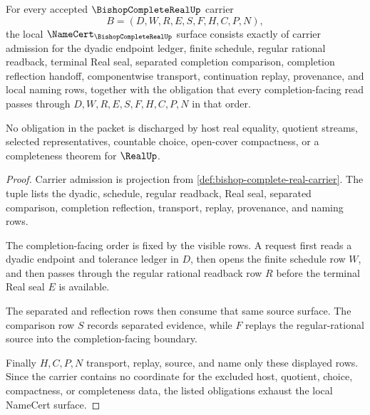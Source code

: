 \begin{theorem}
\label{thm:bishop-complete-real-namecert-obligations}
For every accepted $\BishopCompleteRealUp$ carrier
$$
B=(D,W,R,E,S,F,H,C,P,N),
$$
the local $\NameCert_{\BishopCompleteRealUp}$ surface consists exactly of carrier admission for the dyadic endpoint ledger, finite schedule, regular rational readback, terminal Real seal, separated completion comparison, completion reflection handoff, componentwise transport, continuation replay, provenance, and local naming rows, together with the obligation that every completion-facing read passes through $D,W,R,E,S,F,H,C,P,N$ in that order.

No obligation in the packet is discharged by host real equality, quotient streams, selected representatives, countable choice, open-cover compactness, or a completeness theorem for $\RealUp$.
\end{theorem}
\begin{proof}
Carrier admission is projection from \autoref{def:bishop-complete-real-carrier}. The tuple lists the dyadic, schedule, regular readback, Real seal, separated comparison, completion reflection, transport, replay, provenance, and naming rows.

The completion-facing order is fixed by the visible rows. A request first reads a dyadic endpoint and tolerance ledger in $D$, then opens the finite schedule row $W$, and then passes through the regular rational readback row $R$ before the terminal Real seal $E$ is available.

The separated and reflection rows then consume that same source surface. The comparison row $S$ records separated evidence, while $F$ replays the regular-rational source into the completion-facing boundary.

Finally $H,C,P,N$ transport, replay, source, and name only these displayed rows. Since the carrier contains no coordinate for the excluded host, quotient, choice, compactness, or completeness data, the listed obligations exhaust the local NameCert surface.
\end{proof}

